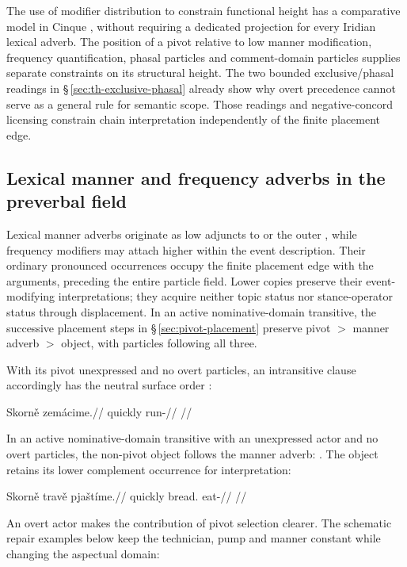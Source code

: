 The use of modifier distribution to constrain functional height has a
comparative model in Cinque \cite{cinque1999}, without requiring a dedicated
projection for every Iridian lexical adverb. The position of a pivot relative
to low manner modification, frequency
quantification, phasal particles and comment-domain particles supplies separate
constraints on its structural height. The two bounded exclusive/phasal readings
in §\,\ref{sec:th-exclusive-phasal} already show why overt precedence cannot
serve as a general rule for semantic scope. Those readings and negative-concord licensing constrain chain interpretation
independently of the finite placement edge.

\subsection{Lexical manner and frequency adverbs in the preverbal field}
\label{sec:lexical-adverb-position}\label{sec:lex-adv}

Lexical manner adverbs originate as low adjuncts to  or the
 outer , while frequency modifiers may attach higher within the
 event description. Their ordinary pronounced occurrences occupy the finite
 placement edge with the arguments, preceding the entire particle field.
 Lower copies preserve their event-modifying interpretations; they acquire
 neither topic status nor stance-operator status through displacement.
 In an active nominative-domain transitive, the successive placement steps in
 §\,\ref{sec:pivot-placement} preserve pivot $>$ manner adverb $>$ object,
 with particles following all three.

\noindent With its pivot unexpressed and no overt particles, an intransitive
clause accordingly has the neutral surface order :

\pex
\a
\begingl
\gla Skorně zemácime.//
\glb quickly run-\Prog{}//
\glft {}//
\endgl
\xe

\noindent In an active nominative-domain transitive with an unexpressed
actor and no overt particles, the non-pivot object follows the manner adverb:
. The object retains its lower complement
occurrence for interpretation:

\pex
\a
\begingl
\gla Skorně travě pjaštíme.//
\glb quickly bread.\Ind{} eat-\Prog{}//
\glft {}//
\endgl
\xe

An overt actor makes the contribution of pivot selection clearer.
The schematic repair examples below keep the technician, pump and manner
constant while changing the aspectual domain:

